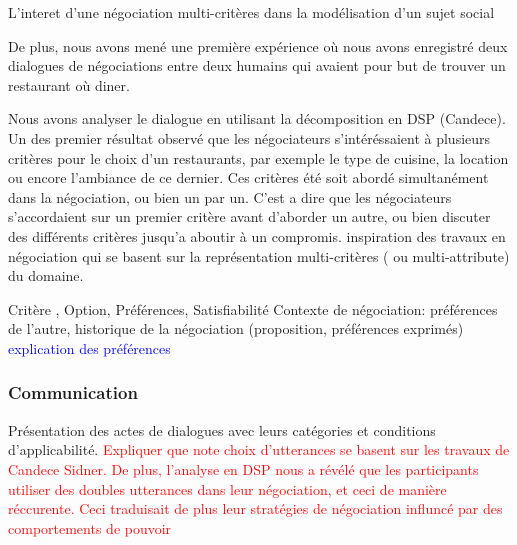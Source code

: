 	L'interet d'une négociation multi-critères dans la modélisation d'un sujet social
	
	De plus, nous avons mené une première expérience où nous avons enregistré deux dialogues de négociations entre deux humains qui avaient pour but de trouver un restaurant où diner.
	
	Nous avons analyser le dialogue en utilisant la décomposition en DSP (Candece). Un des premier résultat observé que les négociateurs s'intéréssaient à plusieurs critères pour le choix d'un restaurants, par exemple le type de cuisine, la location ou encore l'ambiance de ce dernier. Ces critères été soit abordé simultanément dans la négociation, ou bien un par un. C'est a dire que les négociateurs s'accordaient sur un premier critère avant d'aborder un autre, ou bien discuter des différents critères jusqu'a aboutir à un compromis.
		inspiration des travaux en négociation qui se basent sur la représentation multi-critères ( ou multi-attribute) du domaine.
		

Critère , Option, Préférences, Satisfiabilité
Contexte de négociation: préférences de l'autre, historique de la négociation (proposition, préférences exprimés)
\textcolor{blue}{explication des préférences}
\subsubsection{Communication}
Présentation des actes de dialogues avec leurs catégories et conditions d'applicabilité. 
\textcolor{red}{Expliquer que note choix d'utterances se basent sur les travaux de Candece Sidner. De plus, l'analyse en DSP nous a révélé que les participants utiliser des doubles utterances dans leur négociation, et ceci de manière réccurente. Ceci traduisait de plus leur stratégies de négociation influncé par des comportements de pouvoir}

